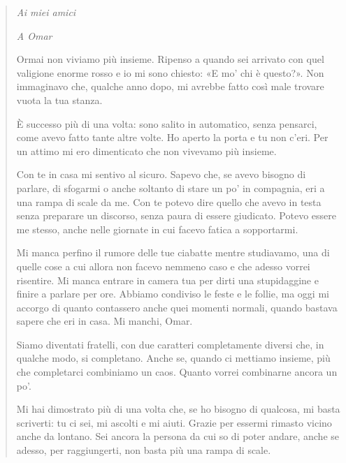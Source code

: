 \clearpage
\begin{quote}
\vspace{10mm}
\begin{center}
    \textit{Ai miei amici}
\end{center}
\vspace{5mm}

\textit{A Omar}\par
\vspace{2mm}
Ormai non viviamo più insieme. Ripenso a quando sei arrivato con quel valigione enorme rosso e io mi sono chiesto: «E mo' chi è questo?». Non immaginavo che, qualche anno dopo, mi avrebbe fatto così male trovare vuota la tua stanza.\par

È successo più di una volta: sono salito in automatico, senza pensarci, come avevo fatto tante altre volte. Ho aperto la porta e tu non c'eri. Per un attimo mi ero dimenticato che non vivevamo più insieme.\par

Con te in casa mi sentivo al sicuro. Sapevo che, se avevo bisogno di parlare, di sfogarmi o anche soltanto di stare un po' in compagnia, eri a una rampa di scale da me. Con te potevo dire quello che avevo in testa senza preparare un discorso, senza paura di essere giudicato. Potevo essere me stesso, anche nelle giornate in cui facevo fatica a sopportarmi.\par

Mi manca perfino il rumore delle tue ciabatte mentre studiavamo, una di quelle cose a cui allora non facevo nemmeno caso e che adesso vorrei risentire. Mi manca entrare in camera tua per dirti una stupidaggine e finire a parlare per ore. Abbiamo condiviso le feste e le follie, ma oggi mi accorgo di quanto contassero anche quei momenti normali, quando bastava sapere che eri in casa. Mi manchi, Omar.\par

Siamo diventati fratelli, con due caratteri completamente diversi che, in qualche modo, si completano. Anche se, quando ci mettiamo insieme, più che completarci combiniamo un caos. Quanto vorrei combinarne ancora un po'.\par

Mi hai dimostrato più di una volta che, se ho bisogno di qualcosa, mi basta scriverti: tu ci sei, mi ascolti e mi aiuti. Grazie per essermi rimasto vicino anche da lontano. Sei ancora la persona da cui so di poter andare, anche se adesso, per raggiungerti, non basta più una rampa di scale.\par


\end{quote}
